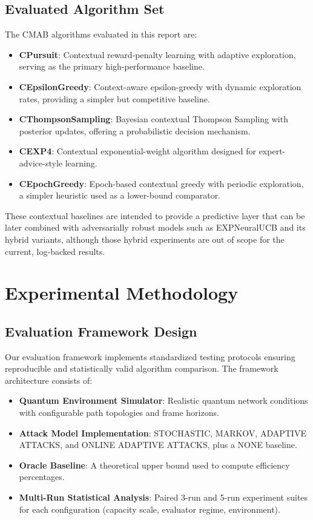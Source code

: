\documentclass[12pt,a4paper]{article}
\begin{document}
\subsection{Evaluated Algorithm Set}

The CMAB algorithms evaluated in this report are:

\begin{itemize}
\item \textbf{CPursuit}: Contextual reward-penalty learning with adaptive exploration, serving as the primary high-performance baseline.
\item \textbf{CEpsilonGreedy}: Context-aware epsilon-greedy with dynamic exploration rates, providing a simpler but competitive baseline.
\item \textbf{CThompsonSampling}: Bayesian contextual Thompson Sampling with posterior updates, offering a probabilistic decision mechanism.
\item \textbf{CEXP4}: Contextual exponential-weight algorithm designed for expert-advice-style learning.
\item \textbf{CEpochGreedy}: Epoch-based contextual greedy with periodic exploration, a simpler heuristic used as a lower-bound comparator.
\end{itemize}

These contextual baselines are intended to provide a predictive layer that can be later combined with adversarially robust models such as EXPNeuralUCB and its hybrid variants, although those hybrid experiments are out of scope for the current, log-backed results.

\section{Experimental Methodology}

\subsection{Evaluation Framework Design}

Our evaluation framework implements standardized testing protocols ensuring reproducible and statistically valid algorithm comparison. The framework architecture consists of:

\begin{itemize}
\item \textbf{Quantum Environment Simulator}: Realistic quantum network conditions with configurable path topologies and frame horizons.
\item \textbf{Attack Model Implementation}: STOCHASTIC, MARKOV, ADAPTIVE ATTACKS, and ONLINE ADAPTIVE ATTACKS, plus a NONE baseline.
\item \textbf{Oracle Baseline}: A theoretical upper bound used to compute efficiency percentages.
\item \textbf{Multi-Run Statistical Analysis}: Paired 3-run and 5-run experiment suites for each configuration (capacity scale, evaluator regime, environment).
\end{itemize}
\end{document}
